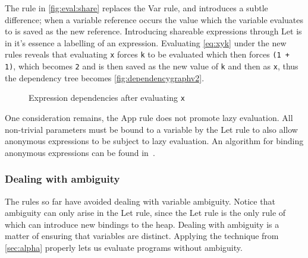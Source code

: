 The rule in \autoref{fig:eval:share} replaces the Var rule, and introduces a subtle difference; when a variable reference occurs the value which the variable evaluates to is saved as the new reference.
Introducing shareable expressions through Let is in it's essence a labelling of an expression.
Evaluating \autoref{eq:xyk} under the new rules reveals that evaluating \texttt{x} forces \texttt{k} to be evaluated which then forces \texttt{(1 + 1)}, which becomes \texttt{2} and is then saved as the new value of \texttt{k} and then as \texttt{x}, thus the dependency tree becomes \autoref{fig:dependencygraphv2}.
\begin{figure}[ht]
  \centering
  \caption{Expression dependencies after evaluating \texttt{x}}
  \label{fig:dependencygraphv2}
\end{figure}
One consideration remains, the App rule does not promote lazy evaluation.
All non-trivial parameters must be bound to a variable by the Let rule to also allow anonymous expressions to be subject to lazy evaluation.
An algorithm for binding anonymous expressions can be found in~\cite{launchbury1993natural}.

\subsubsection{Dealing with ambiguity}
The rules so far have avoided dealing with variable ambiguity.
Notice that ambiguity can only arise in the Let rule, since the Let rule is the only rule of which can introduce new bindings to the heap.
Dealing with ambiguity is a matter of ensuring that variables are distinct.
Applying the technique from \autoref{sec:alpha} properly lets us evaluate programs without ambiguity.

